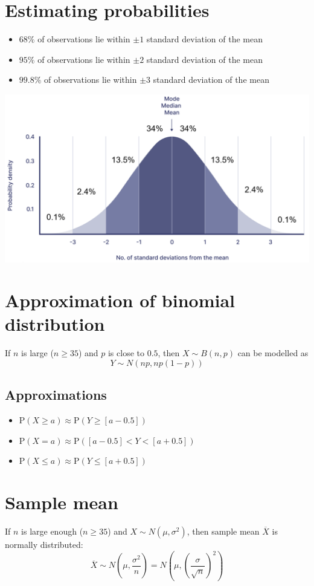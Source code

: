 \section{Estimating probabilities}
\begin{itemize}
	\item $68\%$ of observations lie within $\pm 1$ standard deviation of the mean
	\item $95\%$ of observations lie within $\pm 2$ standard deviation of the mean
	\item $99.8\%$ of observations lie within $\pm 3$ standard deviation of the mean
\end{itemize}
\includegraphics[width=0.7\linewidth]{images/normal_estimate}

\section{Approximation of binomial distribution}
If $n$ is large ($n\geq35$) and $p$ is close to $0.5$, then $X \sim B(n,p)$ can be modelled as $$Y \sim N(np, np(1-p))$$
\subsection{Approximations}
\begin{itemize}
	\item $\text{P}(X\geq a)\approx \text{P}(Y\geq [a-0.5])$
	\item $\text{P}(X=a)\approx \text{P}([a-0.5]<Y<[a+0.5])$
	\item $\text{P}(X \leq a)\approx \text{P}(Y\leq [a+0.5])$
\end{itemize}


\section{Sample mean}
If $n$ is large enough ($n\geq35$) and $X\sim N(\mu, \sigma^2)$, then sample mean $\overline{X}$ is normally distributed: $$\overline{X} \sim N\left(\mu, \frac{\sigma^2}{n}\right)=N\left(\mu, \left(\frac{\sigma}{\sqrt{n}}\right)^2\right)$$